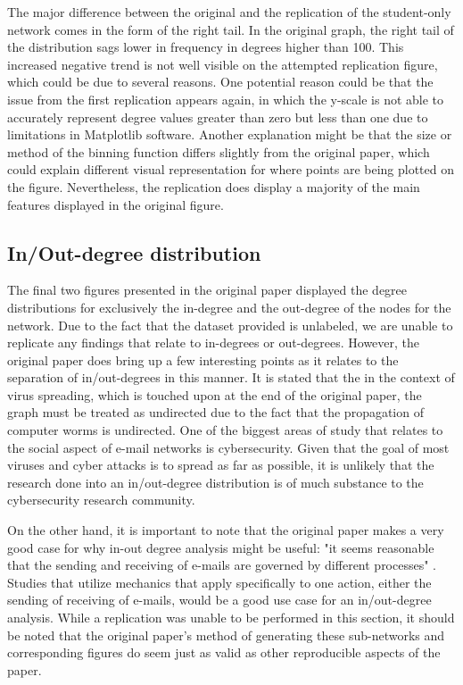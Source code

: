 \documentclass[11pt]{article}
\begin{document}
\begin{multicols}{2}
The major difference between the original and the replication of the student-only network comes in the form of the right tail. In the original graph, the right tail of the distribution sags lower in frequency in degrees higher than 100. This increased negative trend is not well visible on the attempted replication figure, which could be due to several reasons. One potential reason could be that the issue from the first replication appears again, in which the y-scale is not able to accurately represent degree values greater than zero but less than one due to limitations in Matplotlib software. Another explanation might be that the size or method of the binning function differs slightly from the original paper, which could explain different visual representation for where points are being plotted on the figure. Nevertheless, the replication does display a majority of the main features displayed in the original figure.


\subsection{In/Out-degree distribution}
\hspace*{\parindent}The final two figures presented in the original paper displayed the degree distributions for exclusively the in-degree and the out-degree of the nodes for the network. Due to the fact that the dataset provided is unlabeled, we are unable to replicate any findings that relate to in-degrees or out-degrees. However, the original paper does bring up a few interesting points as it relates to the separation of in/out-degrees in this manner. It is stated that the in the context of virus spreading, which is touched upon at the end of the original paper, the graph must be treated as undirected due to the fact that the propagation of computer worms is undirected. One of the biggest areas of study that relates to the social aspect of e-mail networks is cybersecurity. Given that the goal of most viruses and cyber attacks is to spread as far as possible, it is unlikely that the research done into an in/out-degree distribution is of much substance to the cybersecurity research community. 

On the other hand, it is important to note that the original paper makes a very good case for why in-out degree analysis might be useful: "it seems reasonable that the sending and receiving of e-mails are governed by different processes" \cite{1}. Studies that utilize mechanics that apply specifically to one action, either the sending of receiving of e-mails, would be a good use case for an in/out-degree analysis. While a replication was unable to be performed in this section, it should be noted that the original paper's method of generating these sub-networks and corresponding figures do seem just as valid as other reproducible aspects of the paper.



\end{multicols}
\end{document}

